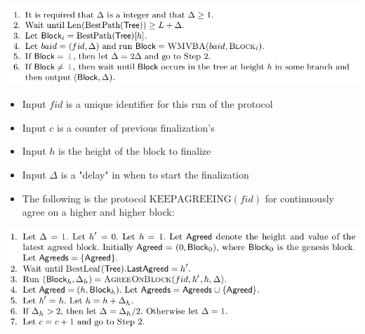 \documentclass[11pt]{article}
\begin{document}
\begin{center}
\includegraphics[width=.9\linewidth]{Blockchains/screenshot_2018-10-29_10-00-20.png}
\end{center}
\begin{itemize}
\item Input \(fid\) is a unique identifier for this run of the  protocol
\item Input \(c\) is a counter of previous finalization's
\item Input \(h\) is the height of the block to finalize
\item Input \(\Delta\) is a "delay" in when to start the finalization

\item The following is the protocol \(\text{KEEPAGREEING}(fid)\) for continuously agree on a higher and higher block:
\end{itemize}
\begin{center}
\includegraphics[width=.9\linewidth]{Blockchains (11)/screenshot_2018-10-30_19-52-31.png}
\end{center}
\end{document}
